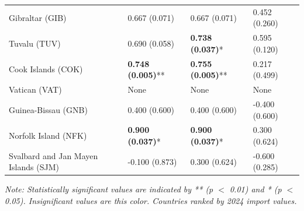 \begin{longtable}{p{5cm}p{3cm}p{3cm}p{5cm}}
Gibraltar (GIB) & \textcolor{atlOrange600}{0.667 (0.071)} & \textcolor{atlOrange600}{0.667 (0.071)} & \textcolor{atlOrange600}{0.452 (0.260)} \\
Tuvalu (TUV) & \textcolor{atlOrange600}{0.690 (0.058)} & \textcolor{atlLime600}{\textbf{0.738 (0.037)}*} & \textcolor{atlOrange600}{0.595 (0.120)} \\
Cook Islands (COK) & \textcolor{atlLime600}{\textbf{0.748 (0.005)}**} & \textcolor{atlLime600}{\textbf{0.755 (0.005)}**} & \textcolor{atlOrange600}{0.217 (0.499)} \\
Vatican (VAT) & None & None & None \\
Guinea-Bissau (GNB) & \textcolor{atlOrange600}{0.400 (0.600)} & \textcolor{atlOrange600}{0.400 (0.600)} & \textcolor{atlOrange600}{-0.400 (0.600)} \\
Norfolk Island (NFK) & \textcolor{atlLime600}{\textbf{0.900 (0.037)}*} & \textcolor{atlLime600}{\textbf{0.900 (0.037)}*} & \textcolor{atlOrange600}{0.300 (0.624)} \\
Svalbard and Jan Mayen Islands (SJM) & \textcolor{atlOrange600}{-0.100 (0.873)} & \textcolor{atlOrange600}{0.300 (0.624)} & \textcolor{atlOrange600}{-0.600 (0.285)} \\
\end{longtable}

\textit{Note: Statistically significant values are indicated by \textcolor{atlLime600}{**} (p $<$ 0.01) and \textcolor{atlLime600}{*} (p $<$ 0.05). Insignificant values are \textcolor{atlOrange600}{this color}. Countries ranked by 2024 import values.}